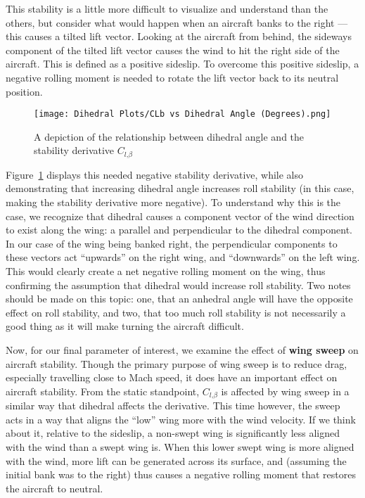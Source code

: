 \documentclass{article}
\begin{document}
This stability is a little more difficult to visualize and understand than the others, but consider what would happen when an aircraft banks to the right --- this causes a tilted lift vector.
Looking at the aircraft from behind, the sideways component of the tilted lift vector causes the wind to hit the right side of the aircraft. This is defined as a positive sideslip.
To overcome this positive sideslip, a negative rolling moment is needed to rotate the lift vector back to its neutral position.

\begin{figure}[H]
    \centering
    \texttt{[image: Dihedral Plots/CLb vs Dihedral Angle (Degrees).png]}
    \caption{A depiction of the relationship between dihedral angle and the stability derivative $C_{l \text{,} \beta}$\label{fig:Clb}}
\end{figure}

Figure~\ref{fig:Clb} displays this needed negative stability derivative, while also demonstrating that increasing dihedral angle increases roll stability (in this case, making the stability derivative more negative).
To understand why this is the case, we recognize that dihedral causes a component vector of the wind direction to exist along the wing: a parallel and perpendicular to the dihedral component.
In our case of the wing being banked right, the perpendicular components to these vectors act ``upwards'' on the right wing, and ``downwards'' on the left wing.
This would clearly create a net negative rolling moment on the wing, thus confirming the assumption that dihedral would increase roll stability.
Two notes should be made on this topic: one, that an anhedral angle will have the opposite effect on roll stability, and two, that too much roll stability is not necessarily a good thing as it will make turning the aircraft difficult.

\bigskip


Now, for our final parameter of interest, we examine the effect of \textbf{wing sweep} on aircraft stability. Though the primary purpose of wing sweep is to reduce drag, especially travelling close to Mach speed, it does have an important effect on aircraft stability.
From the static standpoint, $C_{l\text{,}\beta}$ is affected by wing sweep in a similar way that dihedral affects the derivative.
This time however, the sweep acts in a way that aligns the ``low'' wing more with the wind velocity.
If we think about it, relative to the sideslip, a non-swept wing is significantly less aligned with the wind than a swept wing is.
When this lower swept wing is more aligned with the wind, more lift can be generated across its surface, and (assuming the initial bank was to the right) thus causes a negative rolling moment that restores the aircraft to neutral.
\end{document}
